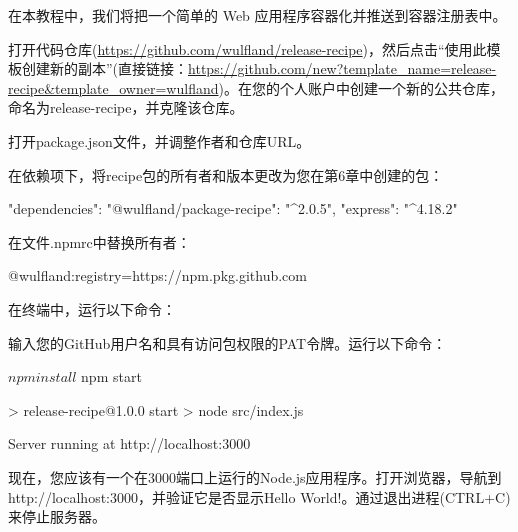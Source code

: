 在本教程中，我们将把一个简单的 Web 应用程序容器化并推送到容器注册表中。


打开代码仓库(\url{https://github.com/wulfland/release-recipe})，然后点击“使用此模板创建新的副本”(直接链接：\url{https://github.com/new?template_name=release-recipe&template_owner=wulfland})。在您的个人账户中创建一个新的公共仓库，命名为release-recipe，并克隆该仓库。

打开package.json文件，并调整作者和仓库URL。

在依赖项下，将recipe包的所有者和版本更改为您在第6章中创建的包：

\begin{shell}
"dependencies": {
  "@wulfland/package-recipe": "^2.0.5",
  "express": "^4.18.2"
}
\end{shell}

在文件.npmrc中替换所有者：

\begin{shell}
@wulfland:registry=https://npm.pkg.github.com
\end{shell}

在终端中，运行以下命令：


输入您的GitHub用户名和具有访问包权限的PAT令牌。运行以下命令：

\begin{shell}
$ npm install
$ npm start

> release-recipe@1.0.0 start
> node src/index.js

Server running at http://localhost:3000
\end{shell}

现在，您应该有一个在3000端口上运行的Node.js应用程序。打开浏览器，导航到http://localhost:3000，并验证它是否显示Hello World!。通过退出进程(CTRL+C)来停止服务器。


